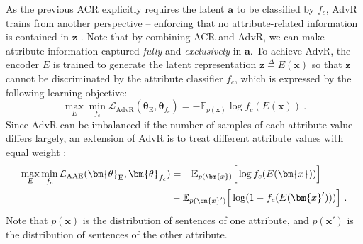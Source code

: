 As the previous ACR explicitly requires the latent $\bm{a}$ to be classified by $f_c$, AdvR trains from another perspective -- enforcing that no attribute-related information is contained in $\bm{z}$ . Note that by combining ACR and AdvR, we can make attribute information captured \textit{fully} and \textit{exclusively} in $\bm{a}$.
To achieve AdvR, the encoder $E$ is trained to generate the latent representation $\bm{z} \overset{\Delta}{=} E(\bm{x})$ so that $\bm{z}$ cannot be discriminated by the attribute classifier $f_c$, which is expressed by the following learning objective:
\begin{equation}
    \max_{E} \min_{f_c} \mathcal{L}_{\mathrm{AdvR}}(\bm{\theta}_{\mathrm{E}},\bm{\theta}_{f_c})=-\mathbb{E}_{p(\bm{x})}\log f_c(E(\bm{x}))
    ~.
\end{equation}
Since AdvR can be imbalanced if the number of samples of each attribute value differs largely, an extension of AdvR is to treat different attribute values with equal weight :
\begin{equation}
\begin{split}
    \max_{E} \min_{f_c} \mathcal{L}_{\mathrm{AAE}}(\bm{\theta}_{\mathrm{E}},\bm{\theta}_{f_c})&=- \mathbb{E}_{p(\bm{x})}\Big{[}\log f_c(E(\bm{x}))\Big{]} \\
    &- \mathbb{E}_{p(\bm{x}')}\Big{[}\log(1-f_c(E(\bm{x}')))\Big{]}~.
\end{split}
\label{equation:alignment-auto-encoder}
\end{equation}
Note that $p(\bm{x})$ is the distribution of sentences of one attribute, and $p(\bm{x}')$ is the distribution of sentences of the other attribute.

